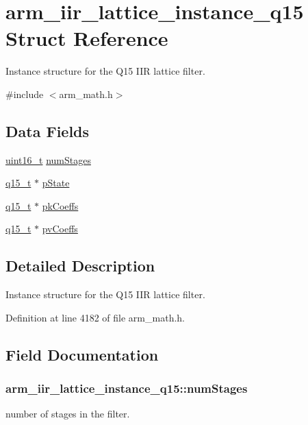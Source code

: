 \hypertarget{structarm__iir__lattice__instance__q15}{\section{arm\-\_\-iir\-\_\-lattice\-\_\-instance\-\_\-q15 Struct Reference}
\label{structarm__iir__lattice__instance__q15}
}


Instance structure for the Q15 I\-I\-R lattice filter.  




{\ttfamily \#include $<$arm\-\_\-math.\-h$>$}

\subsection*{Data Fields}
\begin{DoxyCompactItemize}
\item 
\hyperlink{stdint_8h_a273cf69d639a59973b6019625df33e30}{uint16\-\_\-t} \hyperlink{structarm__iir__lattice__instance__q15_a96fbed313bef01070409fa182d26ba3f}{num\-Stages}
\item 
\hyperlink{arm__math_8h_ab5a8fb21a5b3b983d5f54f31614052ea}{q15\-\_\-t} $\ast$ \hyperlink{structarm__iir__lattice__instance__q15_afd0136ab917b529554d93f41a5e04618}{p\-State}
\item 
\hyperlink{arm__math_8h_ab5a8fb21a5b3b983d5f54f31614052ea}{q15\-\_\-t} $\ast$ \hyperlink{structarm__iir__lattice__instance__q15_a41c214a1ec38d4a82fae8899d715dd29}{pk\-Coeffs}
\item 
\hyperlink{arm__math_8h_ab5a8fb21a5b3b983d5f54f31614052ea}{q15\-\_\-t} $\ast$ \hyperlink{structarm__iir__lattice__instance__q15_a4c4f57f45b223abbe2a9fb727bd2cad9}{pv\-Coeffs}
\end{DoxyCompactItemize}


\subsection{Detailed Description}
Instance structure for the Q15 I\-I\-R lattice filter. 

Definition at line 4182 of file arm\-\_\-math.\-h.



\subsection{Field Documentation}
\hypertarget{structarm__iir__lattice__instance__q15_a96fbed313bef01070409fa182d26ba3f}{
\subsubsection[{num\-Stages}]{ arm\-\_\-iir\-\_\-lattice\-\_\-instance\-\_\-q15\-::num\-Stages}}\label{structarm__iir__lattice__instance__q15_a96fbed313bef01070409fa182d26ba3f}
number of stages in the filter. 

